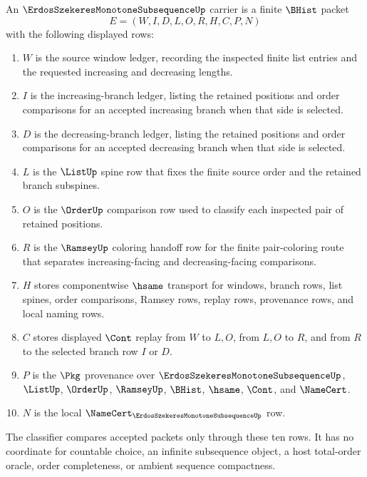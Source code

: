 \begin{definition}
\label{def:erdos-szekeres-monotone-subsequence-carrier}
An $\ErdosSzekeresMonotoneSubsequenceUp$ carrier is a finite $\BHist$ packet
$$
E=(W,I,D,L,O,R,H,C,P,N)
$$
with the following displayed rows:
\begin{enumerate}
\item $W$ is the source window ledger, recording the inspected finite list entries and the requested increasing and decreasing lengths.
\item $I$ is the increasing-branch ledger, listing the retained positions and order comparisons for an accepted increasing branch when that side is selected.
\item $D$ is the decreasing-branch ledger, listing the retained positions and order comparisons for an accepted decreasing branch when that side is selected.
\item $L$ is the $\ListUp$ spine row that fixes the finite source order and the retained branch subspines.
\item $O$ is the $\OrderUp$ comparison row used to classify each inspected pair of retained positions.
\item $R$ is the $\RamseyUp$ coloring handoff row for the finite pair-coloring route that separates increasing-facing and decreasing-facing comparisons.
\item $H$ stores componentwise $\hsame$ transport for windows, branch rows, list spines, order comparisons, Ramsey rows, replay rows, provenance rows, and local naming rows.
\item $C$ stores displayed $\Cont$ replay from $W$ to $L,O$, from $L,O$ to $R$, and from $R$ to the selected branch row $I$ or $D$.
\item $P$ is the $\Pkg$ provenance over $\ErdosSzekeresMonotoneSubsequenceUp$, $\ListUp$, $\OrderUp$, $\RamseyUp$, $\BHist$, $\hsame$, $\Cont$, and $\NameCert$.
\item $N$ is the local $\NameCert_{\ErdosSzekeresMonotoneSubsequenceUp}$ row.
\end{enumerate}
The classifier compares accepted packets only through these ten rows. It has no coordinate for countable choice, an infinite subsequence object, a host total-order oracle, order completeness, or ambient sequence compactness.
\end{definition}

